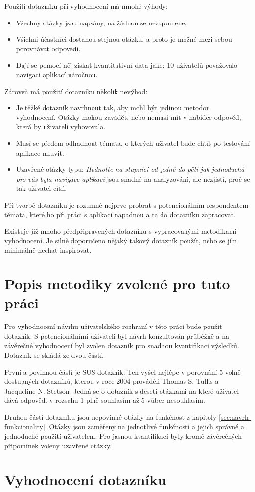 Použití dotazníku při vyhodnocení má mnohé výhody\cite{stone2005user}:
\begin{itemize}
\item Všechny otázky jsou napsány, na žádnou se nezapomene.
\item Všichni účastníci dostanou stejnou otázku, a proto je možné mezi sebou porovnávat odpovědi.
\item Dají se pomocí něj získat kvantitativní data jako: 10 uživatelů považovalo navigaci aplikací náročnou.
\end{itemize}
Zároveň má použití dotazníku několik nevýhod\cite{stone2005user}:
\begin{itemize}
\item Je těžké dotazník navrhnout tak, aby mohl být jedinou metodou vyhodnocení. Otázky mohou zavádět, nebo nemusí mít v nabídce odpověď, která by uživateli vyhovovala.
\item Musí se předem odhadnout témata, o kterých uživatel bude chtít po testování aplikace mluvit.
\item Uzavřené otázky typu: \emph{Hodnoťte na stupnici od jedné do pěti jak jednoduchá pro vás byla navigace aplikací} jsou snadné na analyzování, ale nezjistí, proč se tak uživatel cítil.
\end{itemize}

Při tvorbě dotazníku je rozumné nejprve probrat s potencionálním respondentem témata, které ho při práci s aplikací napadnou a ta do dotazníku zapracovat\cite{stone2005user}.

Existuje již mnoho předpřipravených dotazníků s vypracovanými metodikami vyhodnocení. Je silně doporučeno nějaký takový dotazník použít, nebo se jím minimálně nechat inspirovat\cite{stone2005user}.

\section{Popis metodiky zvolené pro tuto práci}
\label{sec:metodika-dotaznik}
Pro vyhodnocení návrhu uživatelského rozhraní v této práci bude použit dotazník. S potencionálními uživateli byl návrh konzultován průběžně a na závěrečné vyhodnocení byl zvolen dotazník pro snadnou kvantifikaci výsledků. Dotazník se skládá ze dvou částí.

První a povinnou částí je SUS dotazník. Ten vyšel nejlépe v porovnání 5 volně dostupných dotazníků, kterou v roce 2004 prováděli Thomas S. Tullis a Jacqueline N. Stetson\cite{tullis2004comparison}. Jedná se o dotazník s deseti otázkami na které uživatel dává odpovědi v rozsahu 1-plně souhlasím až 5-vůbec nesouhlasím.

Druhou částí dotazníku jsou nepovinné otázky na funkčnost z kapitoly \ref{sec:navrh-funkcionality}. Otázky jsou zaměřeny na jednotlivé funkčnosti a jejich správné a jednoduché použití uživatelem. Pro jasnou kvantifikaci byly kromě závěrečných připomínek voleny uzavřené otázky.


\section{Vyhodnocení dotazníku}
